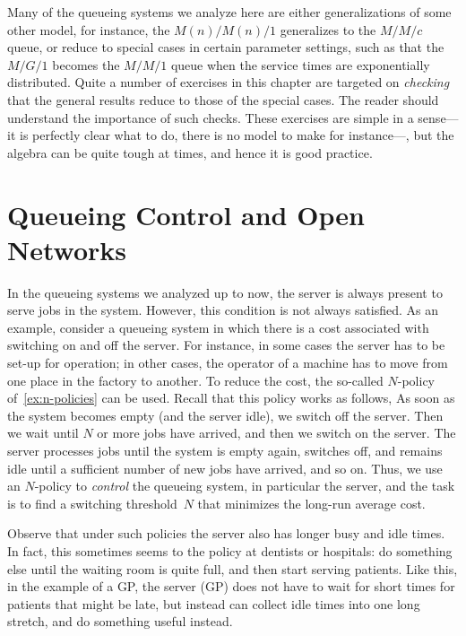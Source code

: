 Many of the queueing systems we analyze here are either generalizations of some other model, for instance, the $M(n)/M(n)/1$ generalizes to the $M/M/c$ queue, or reduce to special cases in certain parameter settings, such as that the $M/G/1$ becomes the $M/M/1$ queue when the service times are exponentially distributed.
Quite a number of exercises in this chapter are targeted on \emph{checking} that the general results reduce to those of the special cases.
The reader should understand the importance of such checks.
These exercises are simple in a sense---it is perfectly clear what to do, there is no model to make for instance---, but the algebra can be quite tough at times, and hence it is good practice.







% 
%


\chapter{Queueing Control and Open Networks}
\label{cha:queu-contr-open}

In the queueing systems we analyzed up to now, the server is always present to serve jobs in the system. However, this condition is not always satisfied.
As an example, consider a queueing system in which there is a cost associated with switching on and off the server.
For instance, in some cases the server has to be set-up for operation; in other cases, the operator of a machine has to move from one place in the factory to another.
To reduce the cost, the  so-called $N$-policy of~\cref{ex:n-policies} can be used. Recall that this policy works as follows, 
As soon as the system becomes empty (and the server idle), we switch off the server.
Then we wait until $N$ or more jobs have arrived, and then we switch on the server.
The server processes jobs until the system is empty again, switches off, and remains idle until a sufficient number of new jobs have arrived,  and so on.
Thus, we use an $N$-policy to \emph{control} the queueing system, in particular the server, and the task is to find a switching threshold~$N$ that minimizes the long-run average cost.

Observe that under such policies the server also has longer busy and idle times.
In fact, this sometimes seems to the policy at dentists or hospitals: do something else until the waiting room is quite full, and then start serving patients.
Like this, in the example of a GP, the server (GP) does not have to wait for short times for patients that might be late, but instead can collect idle times into one long stretch, and do something useful instead.

